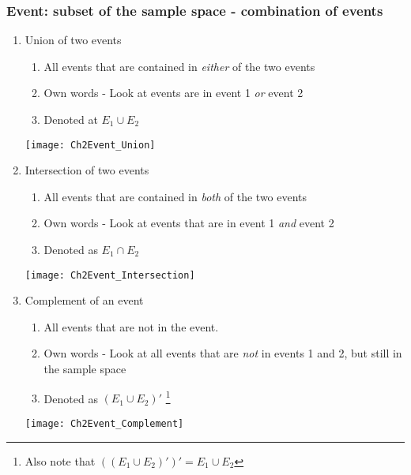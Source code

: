\documentclass[../IND E 315.tex]{subfiles}
\begin{document}
\subsubsection*{Event: subset of the sample space - combination of events}
\begin{enumerate}
    \item Union of two events
        \begin{enumerate}
            \item All events that are contained in \emph{either} of the two events
            \item Own words - Look at events are in event 1 \emph{or} event 2
            \item Denoted at $E_1 \cup E_2$
        \end{enumerate}
        \begin{center}
            \texttt{[image: Ch2Event\_Union]} %
        \end{center}
    \item Intersection of two events
        \begin{enumerate}
            \item All events that are contained in \emph{both} of the two events
            \item Own words - Look at events that are in event 1 \emph{and} event 2
            \item Denoted as $E_1 \cap E_2$
        \end{enumerate}
        \begin{center}
            \texttt{[image: Ch2Event\_Intersection]}
        \end{center}
    \item Complement of an event
        \begin{enumerate}
            \item All events that are not in the event.
            \item Own words - Look at all events that are \emph{not} in events 1 and 2, but still in the sample space
            \item Denoted as $(E_1 \cup E_2)'$ \footnote{Also note that $((E_1 \cup E_2)')' = E_1 \cup E_2$}
        \end{enumerate}
        \begin{center}
            \texttt{[image: Ch2Event\_Complement]}

\end{center}
\end{enumerate}
\end{document}
